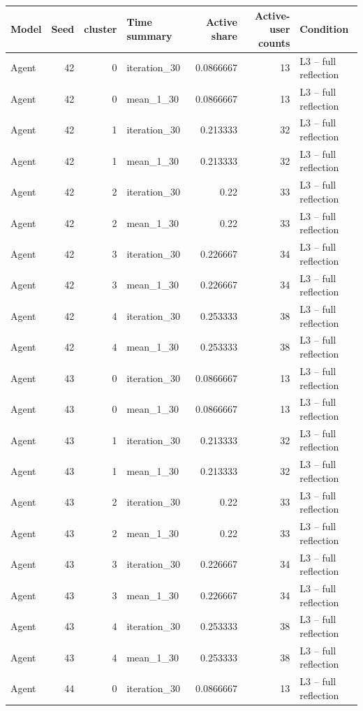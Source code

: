 \begin{table}[htbp!]
\centering
\small
\setlength{\tabcolsep}{3pt}
\renewcommand{\arraystretch}{1.1}
\begin{tabular}{lrrlrrl}
\hline
Model & Seed & cluster & Time summary & Active share & Active-user counts & Condition \\
\hline
Agent & 42 & 0 & iteration\_30 & 0.0866667 & 13 & L3 -- full reflection \\
Agent & 42 & 0 & mean\_1\_30 & 0.0866667 & 13 & L3 -- full reflection \\
Agent & 42 & 1 & iteration\_30 & 0.213333 & 32 & L3 -- full reflection \\
Agent & 42 & 1 & mean\_1\_30 & 0.213333 & 32 & L3 -- full reflection \\
Agent & 42 & 2 & iteration\_30 & 0.22 & 33 & L3 -- full reflection \\
Agent & 42 & 2 & mean\_1\_30 & 0.22 & 33 & L3 -- full reflection \\
Agent & 42 & 3 & iteration\_30 & 0.226667 & 34 & L3 -- full reflection \\
Agent & 42 & 3 & mean\_1\_30 & 0.226667 & 34 & L3 -- full reflection \\
Agent & 42 & 4 & iteration\_30 & 0.253333 & 38 & L3 -- full reflection \\
Agent & 42 & 4 & mean\_1\_30 & 0.253333 & 38 & L3 -- full reflection \\
Agent & 43 & 0 & iteration\_30 & 0.0866667 & 13 & L3 -- full reflection \\
Agent & 43 & 0 & mean\_1\_30 & 0.0866667 & 13 & L3 -- full reflection \\
Agent & 43 & 1 & iteration\_30 & 0.213333 & 32 & L3 -- full reflection \\
Agent & 43 & 1 & mean\_1\_30 & 0.213333 & 32 & L3 -- full reflection \\
Agent & 43 & 2 & iteration\_30 & 0.22 & 33 & L3 -- full reflection \\
Agent & 43 & 2 & mean\_1\_30 & 0.22 & 33 & L3 -- full reflection \\
Agent & 43 & 3 & iteration\_30 & 0.226667 & 34 & L3 -- full reflection \\
Agent & 43 & 3 & mean\_1\_30 & 0.226667 & 34 & L3 -- full reflection \\
Agent & 43 & 4 & iteration\_30 & 0.253333 & 38 & L3 -- full reflection \\
Agent & 43 & 4 & mean\_1\_30 & 0.253333 & 38 & L3 -- full reflection \\
Agent & 44 & 0 & iteration\_30 & 0.0866667 & 13 & L3 -- full reflection \\

\end{tabular}
\end{table}
